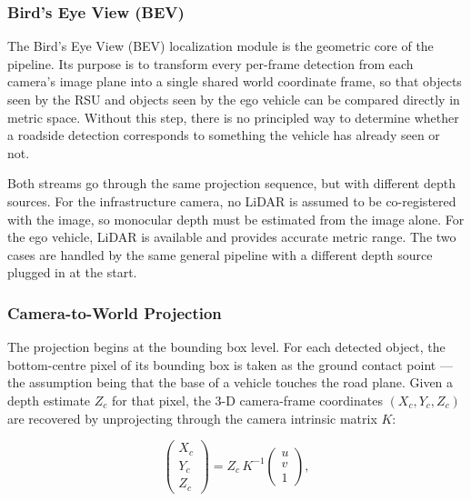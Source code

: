 \documentclass[12pt]{article}
\begin{document}
\subsubsection*{Bird's Eye View (BEV)}

The Bird's Eye View (BEV) localization module is the geometric core of
the pipeline. Its purpose is to transform every per-frame detection from
each camera's image plane into a single shared world coordinate frame,
so that objects seen by the RSU and objects seen by the ego vehicle can
be compared directly in metric space. Without this step, there is no
principled way to determine whether a roadside detection corresponds to
something the vehicle has already seen or not.
 
\medskip
Both streams go through the same projection sequence, but with different
depth sources. For the infrastructure camera, no LiDAR is assumed to be
co-registered with the image, so monocular depth must be estimated from
the image alone. For the ego vehicle, LiDAR is available and provides
accurate metric range. The two cases are handled by the same general
pipeline with a different depth source plugged in at the start.
 
\subsubsection*{Camera-to-World Projection}
 
The projection begins at the bounding box level. For each detected
object, the bottom-centre pixel of its bounding box is taken as the
ground contact point --- the assumption being that the base of a vehicle
touches the road plane. Given a depth estimate $Z_c$ for that pixel, the
3-D camera-frame coordinates $(X_c, Y_c, Z_c)$ are recovered by
unprojecting through the camera intrinsic matrix $K$:
 
\begin{equation}
    \begin{pmatrix} X_c \\ Y_c \\ Z_c \end{pmatrix}
    = Z_c \, K^{-1}
      \begin{pmatrix} u \\ v \\ 1 \end{pmatrix},
    \label{eq:unproject}
\end{equation}
 
\end{document}
